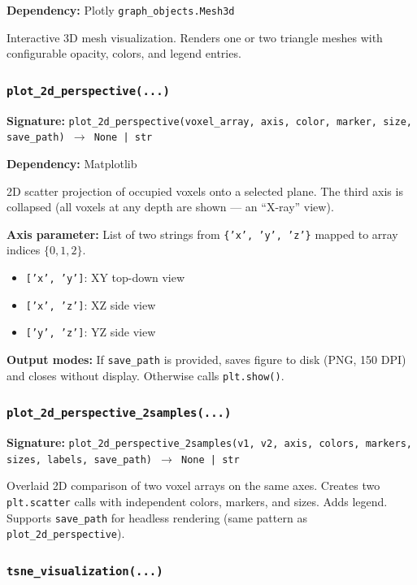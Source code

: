 \documentclass[12pt,a4paper]{article}
\begin{document}
\textbf{Dependency:} Plotly \texttt{graph\_objects.Mesh3d}

Interactive 3D mesh visualization. Renders one or two triangle meshes with configurable opacity, colors, and legend entries.

\subsubsection{\texttt{plot\_2d\_perspective(...)}}

\textbf{Signature:} \texttt{plot\_2d\_perspective(voxel\_array, axis, color, marker, size, save\_path) $\rightarrow$ None | str}

\textbf{Dependency:} Matplotlib

2D scatter projection of occupied voxels onto a selected plane. The third axis is collapsed (all voxels at any depth are shown --- an ``X-ray'' view).

\textbf{Axis parameter:} List of two strings from \texttt{\{'x', 'y', 'z'\}} mapped to array indices $\{0, 1, 2\}$.

\begin{itemize}
  \item \texttt{['x', 'y']}: XY top-down view
  \item \texttt{['x', 'z']}: XZ side view
  \item \texttt{['y', 'z']}: YZ side view
\end{itemize}

\textbf{Output modes:} If \texttt{save\_path} is provided, saves figure to disk (PNG, 150 DPI) and closes without display. Otherwise calls \texttt{plt.show()}.

\subsubsection{\texttt{plot\_2d\_perspective\_2samples(...)}}

\textbf{Signature:} \texttt{plot\_2d\_perspective\_2samples(v1, v2, axis, colors, markers, sizes, labels, save\_path) $\rightarrow$ None | str}

Overlaid 2D comparison of two voxel arrays on the same axes. Creates two \texttt{plt.scatter} calls with independent colors, markers, and sizes. Adds legend. Supports \texttt{save\_path} for headless rendering (same pattern as \texttt{plot\_2d\_perspective}).

\subsubsection{\texttt{tsne\_visualization(...)}}
\end{document}
